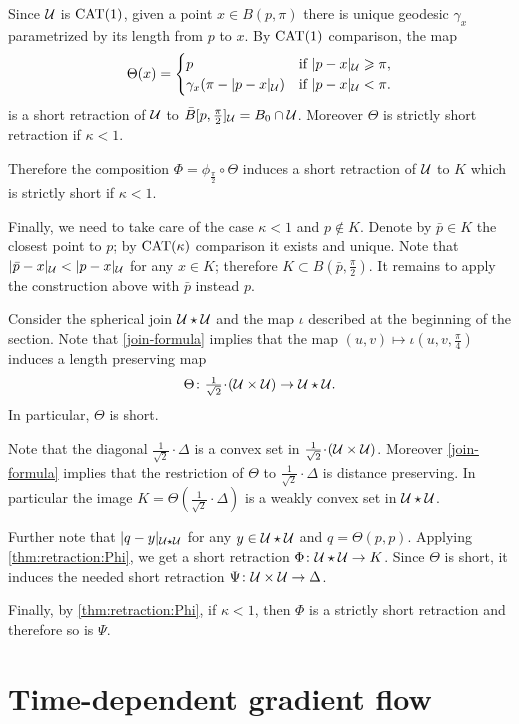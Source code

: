 \documentclass[oneside,a4paper, 12pt]{article}
\begin{document}
Since ${\mathcal{U}}$ is $\mathrm{CAT}(1)$,
given a point $x\in B(p,\pi)$ there is unique geodesic $\gamma_x$ parametrized by its length from $p$ to $x$. 
By $\mathrm{CAT}(1)$ comparison, the map 
\[\Theta(x)=
\begin{cases}
p&\text{if\ }|p-x|_{\mathcal{U}}\geqslant \pi,
\\
\gamma_x(\pi-|p-x|_{\mathcal{U}})&\text{if\ }|p-x|_{\mathcal{U}}< \pi.
\end{cases}
\]
is a short retraction of ${\mathcal{U}}$ to $\bar B[p,\tfrac\pi2]_{\mathcal{U}}=B_0\cap \mathcal{U}$.
Moreover $\Theta$ is strictly short retraction if $\kappa<1$.

Therefore the composition $\Phi=\phi_{\frac\pi2}\circ\Theta$ induces a short retraction of ${\mathcal{U}}$ to $K$
which is strictly short if $\kappa<1$.

Finally, we need to take care of the case $\kappa<1$ and $p\notin K$.
Denote by $\bar p\in K$ the closest point to $p$; by $\mathrm{CAT}(\kappa)$ comparison it exists and unique.
Note that $|\bar p-x|_{\mathcal{U}}< |p-x|_{\mathcal{U}}$ for any $x\in K$;
therefore $K\subset B(\bar p,\tfrac\pi2)$. 
It remains to apply the construction above with $\bar p$ instead $p$.
\qeds


Consider the spherical join $\mathcal{U}\star\mathcal{U}$ and the map $\iota$ described at the beginning of the section. 
Note that \ref{join-formula} implies that the map $(u,v)\mapsto \iota(u,v,\tfrac\pi4)$
induces a length preserving map 
\[\Theta\:{\tfrac1{\sqrt{2}}}\cdot(\spc{U}\times\spc{U})\to\spc{U}\star\spc{U}.\]
In particular, $\Theta$ is short.

Note that the diagonal $\tfrac1{\sqrt{2}}\cdot\Delta$ is a convex set in $\tfrac1{\sqrt{2}}\cdot(\spc{U}\times\spc{U})$.
Moreover \ref{join-formula} implies that the restriction of $\Theta$ to $\tfrac1{\sqrt{2}}\cdot\Delta$ is distance preserving.
In particular the image $K=\Theta(\tfrac1{\sqrt{2}}\cdot\Delta)$ is a weakly convex set in $\mathcal{U}\star\mathcal{U}$.

Further note that $|q-y|_{\mathcal{U}\star\mathcal{U}}$ for any $y\in \mathcal{U}\star\mathcal{U}$ and $q=\Theta(p,p)$.
Applying \ref{thm:retraction:Phi}, we get a short retraction $\Phi\colon\mathcal{U}\star\mathcal{U}\to K$.
Since $\Theta$ is short, it induces the needed short retraction $\Psi\colon\mathcal{U}\times\mathcal{U}\to \Delta$.

Finally, by \ref{thm:retraction:Phi}, if $\kappa<1$, then $\Phi$ is a strictly short retraction and therefore so is $\Psi$.
\qeds

\appendix
\section{Time-dependent gradient flow}
\end{document}
